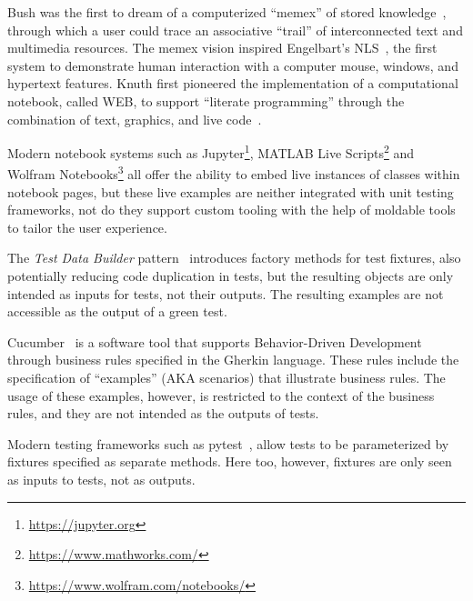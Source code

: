 \documentclass[acmsmall,screen,authorversion,nonacm]{acmart} %
\begin{document}


Bush was the first to dream of a computerized ``memex'' of stored knowledge~\cite{Bush45a}, through which a user could trace an associative ``trail'' of interconnected text and multimedia resources.
The memex vision inspired Engelbart's NLS~\cite{Enge68a}, the first system to demonstrate human interaction with a computer mouse, windows, and hypertext features.
Knuth first pioneered the implementation of a computational notebook, called WEB, to support ``literate programming'' through the combination of text, graphics, and live code~\cite{Knut97a}.

Modern notebook systems such as Jupyter\footnote{\url{https://jupyter.org}}, MATLAB Live Scripts\footnote{\url{https://www.mathworks.com/}} and Wolfram Notebooks\footnote{\url{https://www.wolfram.com/notebooks/}} all offer the ability to embed live instances of classes within notebook pages, but these live examples are neither integrated with unit testing frameworks, not do they support custom tooling with the help of moldable tools to tailor the user experience.


The \emph{Test Data Builder} pattern~\cite{Free09a} introduces factory methods for test fixtures, also potentially reducing code duplication in tests, but the resulting objects are only intended as inputs for tests, not their outputs.
The resulting examples are not accessible as the output of a green test.

Cucumber~\cite{Hell17a} is a software tool that supports Behavior-Driven Development through business rules specified in the Gherkin language.
These rules include the specification of ``examples'' (AKA scenarios) that illustrate business rules.
The usage of these examples, however, is restricted to the context of the business rules, and they are not intended as the outputs of tests.

Modern testing frameworks such as pytest~\cite{Okke22a}, allow tests to be parameterized by fixtures specified as separate methods.
Here too, however, fixtures are only seen as inputs to tests, not as outputs.
\end{document}
